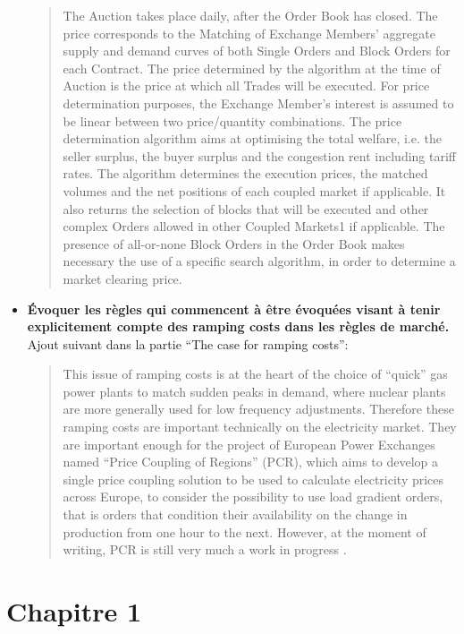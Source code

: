 \documentclass{article}
\begin{document}
\begin{itemize}
\begin{quote}The Auction takes place daily, after the Order Book has closed. The price corresponds to the Matching of Exchange Members' aggregate supply and demand curves of both Single Orders and Block Orders for each Contract. The price determined by the algorithm at the time of Auction is the price at which all Trades will be executed. For price determination purposes, the Exchange Member's interest is assumed to be linear between two price/quantity combinations. The price determination algorithm aims at optimising the total welfare, i.e. the seller surplus, the buyer surplus and the congestion rent including tariff rates. The algorithm determines the execution prices, the matched volumes and the net positions of each coupled market if applicable. It also returns the selection of blocks that will be executed and other complex Orders allowed in other Coupled Markets1 if applicable. The presence of all-or-none Block Orders in the Order Book makes necessary the use of a specific search algorithm, in order to determine a market clearing price.
\cite{EPEXRules}
\end{quote} 

\item \textbf{Évoquer les règles qui commencent à être évoquées visant à tenir explicitement compte des ramping costs dans les règles de marché.}\\

Ajout suivant dans la partie ``The case for ramping costs'':

\begin{quote}
This issue of ramping costs is at the heart of the choice of ``quick'' gas power plants to match sudden peaks in demand, where nuclear plants are more generally used for low frequency adjustments. Therefore these ramping costs are important technically on the electricity market. They are important enough for the project of European Power Exchanges named ``Price Coupling of Regions'' (PCR), which aims to develop a single price coupling solution to be used to calculate electricity prices across Europe, to consider the possibility to use load gradient orders, that is orders that condition their availability on the change in production from one hour to the next. However, at the moment of writing, PCR is still very much a work in progress \cite{EPEXPCR}.\\
\end{quote}
\end{itemize}

\section{Chapitre 1}
\end{document}
